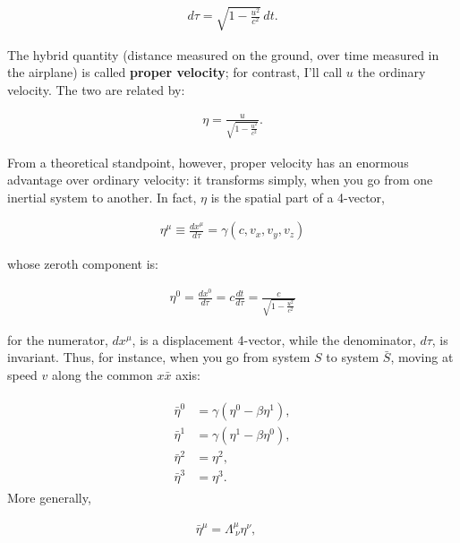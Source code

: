 \documentclass[11pt,letterpaper]{book}
\begin{document}
        \begin{align}
        d\tau = \sqrt{1 - \frac{u^2}{c^2}} \, dt.
        \end{align}
        
        The hybrid quantity (distance measured on the ground, over time measured in the airplane) is called \textbf{proper velocity}; for contrast, I’ll call \(u\) the ordinary velocity. The two are related by:
        
        \begin{align}
        \eta = \frac{u}{\sqrt{1 - \frac{u^2}{c^2}}}.
        \end{align}
        
        From a theoretical standpoint, however, proper velocity has an enormous advantage over ordinary velocity: it transforms simply, when you go from one inertial system to another. In fact, \(\eta\) is the spatial part of a 4-vector,
        
        \begin{align}
        \eta^\mu \equiv \frac{dx^\mu}{d\tau}=\gamma(c, v_x, v_y, v_z)
        \end{align}
        
        whose zeroth component is:
        
        \begin{align}
        \eta^0 = \frac{dx^0}{d\tau} = c \frac{dt}{d\tau} = \frac{c}{\sqrt{1 - \frac{u^2}{c^2}}}
        \end{align}
        
        for the numerator, \(dx^\mu\), is a displacement 4-vector, while the denominator, \(d\tau\), is invariant. Thus, for instance, when you go from system \(S\) to system \(\bar{S}\), moving at speed \(v\) along the common \(x\)\(\bar{x}\) axis:
        
        \begin{align}
        \begin{aligned}
        \bar{\eta}^0 &= \gamma (\eta^0 - \beta \eta^1), \\
        \bar{\eta}^1 &= \gamma (\eta^1 - \beta \eta^0), \\
        \bar{\eta}^2 &= \eta^2, \\
        \bar{\eta}^3 &= \eta^3.
        \end{aligned}
        \end{align}
        More generally,
        
        \begin{align}
        \bar{\eta}^\mu = \Lambda^\mu_{\ \nu} \eta^\nu, \quad
        \end{align}
        
\end{document}
